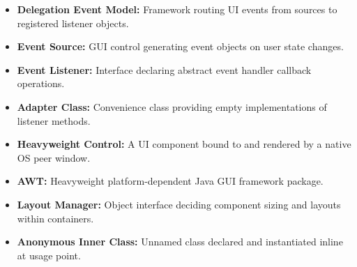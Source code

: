 \documentclass[12pt,a4paper]{article}
\begin{document}
\begin{tcolorbox}[defbox, title={\textbf{One-Line Definitions}}]
\begin{itemize}[leftmargin=*, itemsep=2pt]
  \item \textbf{Delegation Event Model:} Framework routing UI events from sources to registered listener objects.
  \item \textbf{Event Source:} GUI control generating event objects on user state changes.
  \item \textbf{Event Listener:} Interface declaring abstract event handler callback operations.
  \item \textbf{Adapter Class:} Convenience class providing empty implementations of listener methods.
  \item \textbf{Heavyweight Control:} A UI component bound to and rendered by a native OS peer window.
  \item \textbf{AWT:} Heavyweight platform-dependent Java GUI framework package.
  \item \textbf{Layout Manager:} Object interface deciding component sizing and layouts within containers.
  \item \textbf{Anonymous Inner Class:} Unnamed class declared and instantiated inline at usage point.
\end{itemize}
\end{tcolorbox}
\end{document}
